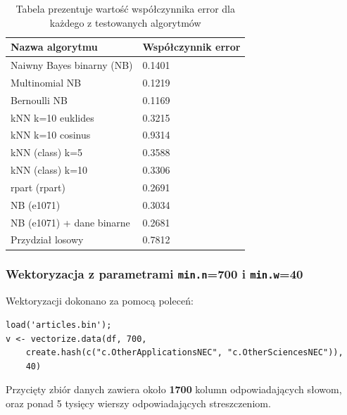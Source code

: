 \documentclass[a4paper,12pt]{article}
\begin{document}
		 \begin{table}	
		 	\centering	 	
		 	\begin{tabular}{|l|l|}
		 		\hline
		 		Nazwa algorytmu & Współczynnik error \\
		 		\hline
		 			Naiwny Bayes binarny (NB) & 0.1401 \\
		 			Multinomial NB & 0.1219 \\
		 			Bernoulli NB & 0.1169 \\
		 			kNN k=10 euklides & 0.3215 \\
		 			kNN k=10 cosinus & 0.9314 \\
		 		\hline
		 			kNN (class) k=5 & 0.3588 \\
		 			kNN (class) k=10 & 0.3306 \\
		 			rpart (rpart) & 0.2691 \\
					NB (e1071) & 0.3034 \\	
					NB (e1071) + dane binarne & 0.2681 \\
				\hline
					Przydział losowy & 	0.7812 \\ 			
		 		\hline
		 	\end{tabular}
		 	\caption{Tabela prezentuje wartość współczynnika error dla
		 	każdego z testowanych algorytmów}
		 \end{table}
		 
		 \clearpage
		 \newpage
		 
		 \subsubsection{Wektoryzacja z parametrami \texttt{min.n}=700 i
		 \texttt{min.w}=40}
		 
		 Wektoryzacji dokonano za pomocą poleceń:
		 \begin{verbatim}
load('articles.bin');
v <- vectorize.data(df, 700, 
	create.hash(c("c.OtherApplicationsNEC", "c.OtherSciencesNEC")),
	40) 
		 \end{verbatim}
		 
		 Przycięty zbiór danych zawiera około \textbf{1700} kolumn odpowiadających
		 słowom,
		 oraz ponad 5 tysięcy wierszy odpowiadających streszczeniom.
		 
\end{document}
